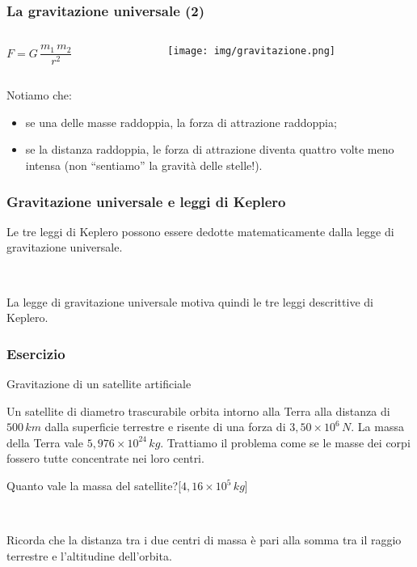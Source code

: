 \documentclass[]{beamer}
\theoremstyle{plain}
\begin{document}
\begin{frame}
\frametitle{La gravitazione universale (2)}
\begin{columns}
\begin{column}{0.3\textwidth}
\begin{center}
\colorbox{blue!30}{$ F = G \,  \dfrac{m_1 \, m_2}{r^2} $}
\end{center}
\end{column}
\begin{column}{0.5\textwidth}
\begin{figure}
\texttt{[image: img/gravitazione.png]}
\end{figure}
\end{column}
\end{columns}\pause

Notiamo che:
\begin{itemize}
  \item se una delle masse raddoppia, la forza di attrazione raddoppia;\pause
  \item se la distanza raddoppia, le forza di attrazione diventa quattro volte meno intensa (non ``sentiamo'' la gravità delle stelle!).
\end{itemize}
\end{frame}


\begin{frame}
\frametitle{Gravitazione universale e leggi di Keplero}
Le tre leggi di Keplero possono essere \alert<1>{dedotte matematicamente} dalla legge di gravitazione universale.\pause

~

La legge di gravitazione universale motiva quindi le tre leggi descrittive di Keplero.
\end{frame}



\begin{frame}
\frametitle{Esercizio}
\begin{exampleblock}{Gravitazione di un satellite artificiale}
  \small{Un satellite di diametro trascurabile orbita intorno alla Terra alla distanza di $ 500 \, km $ dalla superficie terrestre e risente di una forza di $ 3,50 \times 10^{6} \, N $. La massa della Terra vale $ 5,976 \times 10^{24} \, kg $. Trattiamo il problema come se le masse dei corpi fossero tutte concentrate nei loro centri. 

  Quanto vale la massa del satellite?\hspace*{\fill}[$ 4,16 \times 10^{5} \, kg $]}
\end{exampleblock}\pause

~

Ricorda che la distanza tra i due centri di massa è pari alla somma tra il raggio terrestre e l'altitudine dell'orbita.
\end{frame}
\end{document}
